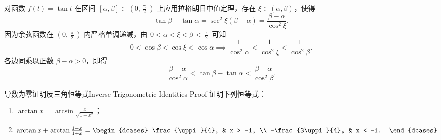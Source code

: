 \begin{myproof}
    对函数 $f(t) = \tan t$ 在区间 $[\alpha, \beta] \subset \left(0, \frac{\uppi}{2}\right)$ 上应用拉格朗日中值定理，存在 $\xi \in (\alpha, \beta)$，使得
    \begin{equation}
        \tan \beta - \tan \alpha = \sec^2 \xi (\beta - \alpha) = \frac{\beta - \alpha}{\cos^2 \xi}.
    \end{equation}
    因为余弦函数在 $\left(0, \frac{\uppi}{2}\right)$ 内严格单调递减，由 $0 < \alpha < \xi < \beta < \frac{\uppi}{2}$ 可知
    \begin{equation}
        0 < \cos \beta < \cos \xi < \cos \alpha \implies \frac{1}{\cos^2 \alpha} < \frac{1}{\cos^2 \xi} < \frac{1}{\cos^2 \beta}.
    \end{equation}
    各边同乘以正数 $\beta - \alpha > 0$，即得
    \begin{equation}
        \frac{\beta - \alpha}{\cos^2 \alpha} < \tan \beta - \tan \alpha < \frac{\beta - \alpha}{\cos^2 \beta}.
    \end{equation}
\end{myproof}

\begin{problem}{导数为零证明反三角恒等式}{Inverse-Trigonometric-Identities-Proof}
    证明下列恒等式：
    \begin{enumerate}
        \item $\arctan x = \arcsin \frac{x}{\sqrt{1+x^2}}$；
        \item $\arctan x + \arctan \frac{1-x}{1+x} = \begin{dcases} \frac{\uppi}{4}, & x > -1, \\ -\frac{3\uppi}{4}, & x < -1. \end{dcases}$
    \end{enumerate}
\end{problem}

